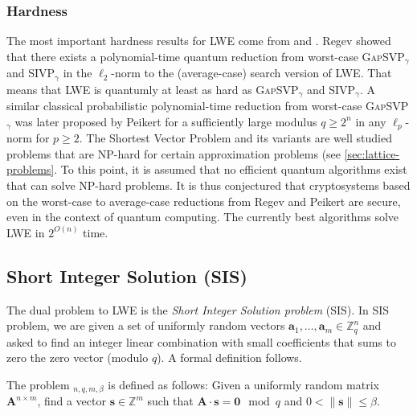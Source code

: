 \subsubsection{Hardness} \label{sec:lwe-hardness}
The most important hardness results for LWE come from \cite{Reg05} and \cite{Pei09}. Regev showed that there exists a polynomial-time quantum reduction from worst-case \textsc{GapSVP}$_\gamma$ and SIVP$_\gamma$ in the $\ell_2$-norm to the (average-case) search version of LWE. That means that LWE is quantumly at least as hard as \textsc{GapSVP}$_\gamma$ and SIVP$_\gamma$. A similar classical probabilistic polynomial-time reduction from worst-case \textsc{GapSVP}$_\gamma$ was later proposed by Peikert for a sufficiently large modulus $q\geq 2^n$ in any $\ell_p$-norm for $p \geq 2$. The Shortest Vector Problem and its variants are well studied problems that are NP-hard for certain approximation problems (see \cref{sec:lattice-problems}. To this point, it is assumed that no efficient quantum algorithms exist that can solve NP-hard problems. It is thus conjectured that cryptosystems based on the worst-case to average-case reductions from Regev and Peikert are secure, even in the context of quantum computing. The currently best algorithms solve LWE in $2^{O(n)}$ time.




\subsection{Short Integer Solution (SIS)}
The dual problem to LWE is the \textit{Short Integer Solution problem} (SIS).
In SIS problem, we are given a set of uniformly random vectors $\mathbf{a}_1, \ldots, \mathbf{a}_m \in \mathbb{Z}_q^n$ and asked to find an integer linear combination with small coefficients that sums to zero the zero vector (modulo $q$). A formal definition follows. %


\begin{definition}
    The problem $_{n, q, m, \beta}$ is defined as follows: Given a uniformly random matrix $\mathbf{A}^{n\times m}$, find a vector $\mathbf{s} \in \mathbb{Z}^m$ such that $\mathbf{A} \cdot \mathbf{s} = \mathbf{0} \mod q$ and $0 < \| \mathbf{s}\| \leq \beta$.
\end{definition}

